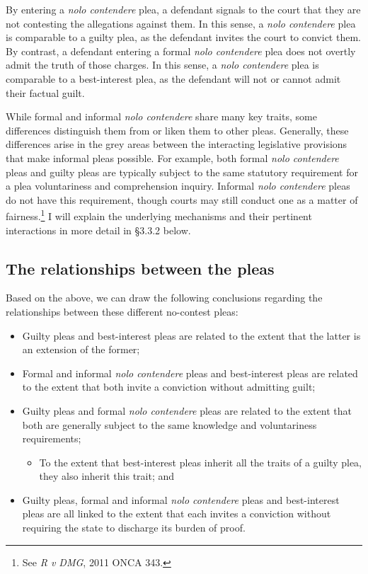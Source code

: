 By entering a \textit{nolo contendere} plea, a defendant signals to the court that they are not contesting the allegations against them. In this sense, a \textit{nolo contendere} plea is comparable to a guilty plea, as the defendant invites the court to convict them. By contrast, a defendant entering a formal \textit{nolo contendere} plea does not overtly admit the truth of those charges. In this sense, a \textit{nolo contendere} plea is comparable to a best-interest plea, as the defendant will not or cannot admit their factual guilt.

While formal and informal \textit{nolo contendere} share many key traits, some differences distinguish them from or liken them to other pleas. Generally, these differences arise in the grey areas between the interacting legislative provisions that make informal pleas possible. For example, both formal \textit{nolo contendere} pleas and guilty pleas are typically subject to the same statutory requirement for a plea voluntariness and comprehension inquiry. Informal \textit{nolo contendere} pleas do not have this requirement, though courts may still conduct one as a matter of fairness.\footnote{See \textit{R v DMG}, 2011 ONCA 343.} I will explain the underlying mechanisms and their pertinent interactions in more detail in §3.3.2 below.

\subsection{The relationships between the pleas}

Based on the above, we can draw the following conclusions regarding the relationships between these different no-contest pleas:
\begin{itemize}
\item Guilty pleas and best-interest pleas are related to the extent that the latter is an extension of the former;
\item Formal and informal \textit{nolo contendere} pleas and best-interest pleas are related to the extent that both invite a conviction without admitting guilt; 
\item Guilty pleas and formal \textit{nolo contendere} pleas are related to the extent that both are generally subject to the same knowledge and voluntariness requirements;

    \begin{itemize}
    \item To the extent that best-interest pleas inherit all the traits of a guilty plea, they also inherit this trait; and
    \end{itemize}

\item Guilty pleas, formal and informal \textit{nolo contendere} pleas and best-interest pleas are all linked to the extent that each invites a conviction without requiring the state to discharge its burden of proof.
\end{itemize}